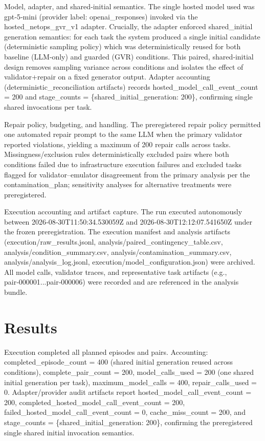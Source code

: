 \documentclass[conference]{IEEEtran}
\begin{document}
Model, adapter, and shared‑initial semantics. The single hosted model used was gpt‑5‑mini (provider label: openai\_responses) invoked via the hosted\_netops\_gvr\_v1 adapter. Crucially, the adapter enforced shared\_initial generation semantics: for each task the system produced a single initial candidate (deterministic sampling policy) which was deterministically reused for both baseline (LLM‑only) and guarded (GVR) conditions. This paired, shared‑initial design removes sampling variance across conditions and isolates the effect of validator+repair on a fixed generator output. Adapter accounting (deterministic\_reconciliation artifacts) records hosted\_model\_call\_event\_count = 200 and stage\_counts = \{shared\_initial\_generation: 200\}, confirming single shared invocations per task.

Repair policy, budgeting, and handling. The preregistered repair policy permitted one automated repair prompt to the same LLM when the primary validator reported violations, yielding a maximum of 200 repair calls across tasks. Missingness/exclusion rules deterministically excluded pairs where both conditions failed due to infrastructure execution failures and excluded tasks flagged for validator--emulator disagreement from the primary analysis per the contamination\_plan; sensitivity analyses for alternative treatments were preregistered.

Execution accounting and artifact capture. The run executed autonomously between 2026‑08‑30T11:50:34.530059Z and 2026‑08‑30T12:12:07.541650Z under the frozen preregistration. The execution manifest and analysis artifacts (execution/raw\_results.jsonl, analysis/paired\_contingency\_table.csv, analysis/condition\_summary.csv, analysis/contamination\_summary.csv, analysis/analysis\_log.jsonl, execution/model\_configuration.json) were archived. All model calls, validator traces, and representative task artifacts (e.g., pair‑000001...pair‑000006) were recorded and are referenced in the analysis bundle.

\section{Results}
Execution completed all planned episodes and pairs. Accounting: completed\_episode\_count = 400 (shared initial generation reused across conditions), complete\_pair\_count = 200, model\_calls\_used = 200 (one shared initial generation per task), maximum\_model\_calls = 400, repair\_calls\_used = 0. Adapter/provider audit artifacts report hosted\_model\_call\_event\_count = 200, completed\_hosted\_model\_call\_event\_count = 200, failed\_hosted\_model\_call\_event\_count = 0, cache\_miss\_count = 200, and stage\_counts = \{shared\_initial\_generation: 200\}, confirming the preregistered single shared initial invocation semantics.
\end{document}
